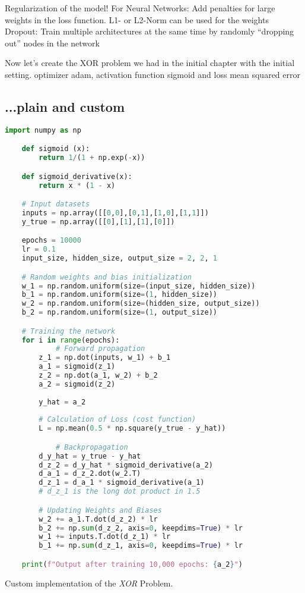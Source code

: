 Regularization of the model!
For Neural Networks: 
Add penalties for large weights in the loss function. L1- or L2-Norm can be used for the weights
Dropout: Train multiple architectures at the same time by randomly “dropping out” nodes in the network


Now let's create the XOR problem we had in the initial chapter with the initial setting.
optimizer adam, activation function sigmoid and loss mean squared error
%
%
%
\clearpage
%
%
\subsection{...plain and custom}	
%
%
\vspace{-1cm}
\begin{algorithm}
	\begin{lstlisting}[language=Python]
	import numpy as np 

	def sigmoid (x):
	    return 1/(1 + np.exp(-x))

	def sigmoid_derivative(x):
	    return x * (1 - x)

	# Input datasets
	inputs = np.array([[0,0],[0,1],[1,0],[1,1]])
	y_true = np.array([[0],[1],[1],[0]])

	epochs = 10000
	lr = 0.1
	input_size, hidden_size, output_size = 2, 2, 1

	# Random weights and bias initialization
	w_1 = np.random.uniform(size=(input_size, hidden_size))
	b_1 = np.random.uniform(size=(1, hidden_size))
	w_2 = np.random.uniform(size=(hidden_size, output_size))
	b_2 = np.random.uniform(size=(1, output_size))

	# Training the network
	for i in range(epochs):
			# Forward propagation
	    z_1 = np.dot(inputs, w_1) + b_1
	    a_1 = sigmoid(z_1)
	    z_2 = np.dot(a_1, w_2) + b_2
	    a_2 = sigmoid(z_2)
	    
	    y_hat = a_2
	    
	    # Calculation of Loss (cost function)
	    L = np.mean(0.5 * np.square(y_true - y_hat))

			# Backpropagation
	    d_y_hat = y_true - y_hat
	    d_z_2 = d_y_hat * sigmoid_derivative(a_2)
	    d_a_1 = d_z_2.dot(w_2.T)
	    d_z_1 = d_a_1 * sigmoid_derivative(a_1) 
		# d_z_1 is the long dot product in 1.5

		# Updating Weights and Biases
	    w_2 += a_1.T.dot(d_z_2) * lr
	    b_2 += np.sum(d_z_2, axis=0, keepdims=True) * lr
	    w_1 += inputs.T.dot(d_z_1) * lr
	    b_1 += np.sum(d_z_1, axis=0, keepdims=True) * lr

	print(f"Output after training 10,000 epochs: {a_2}")

\end{lstlisting}
\caption[Custom implementation of the \textit{XOR} Problem]{Custom implementation of the \textit{XOR} Problem.}
\label{alg:xor_ann_own}	
\end{algorithm}

